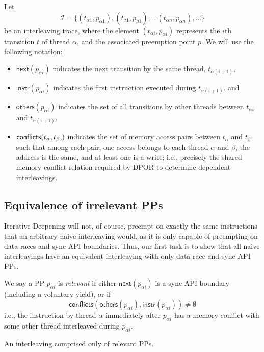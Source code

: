 \newcommand\ppnext[1]{\ensuremath{\mathsf{next}(#1)}}
\newcommand\ppinstr[1]{\ensuremath{\mathsf{instr}(#1)}}
\newcommand\ppothers[1]{\ensuremath{\mathsf{others}(#1)}}
\newcommand\pppfx[1]{\ensuremath{\mathsf{pfx}(#1)}}
\newcommand\conflicts[2]{\ensuremath{\mathsf{conflicts}(#1,#2)}}
\newcommand\pai{\ensuremath{p_{\alpha{}i}}}
\newcommand\tai{\ensuremath{t_{\alpha{}i}}}
Let
\[
	\mathcal{I} = \{(t_{\alpha{}1}, p_{\alpha{}1}), (t_{\beta{}1}, p_{\beta{}1}), ... (t_{\alpha{}n}, p_{\alpha{}n}), ...\}
\]
be an interleaving trace, where the element $(\tai, \pai)$ represents the $i$th transition $t$ of thread $\alpha$, and the associated preemption point $p$.
We will use the following notation:
\begin{itemize}
	\item $\ppnext{\pai}$ indicates the next transition by the same thread, $t_{\alpha{}(i+1)}$,
	\item $\ppinstr{\pai}$ indicates the first instruction executed during $t_{\alpha{}(i+1)}$. and
	\item $\ppothers{\pai}$ indicates the set of all transitions by other threads between $\tai$ and $t_{\alpha{}(i+1)}$.
	\item $\conflicts{t_\alpha,t_\beta}$ indicates the set of memory access pairs between $t_\alpha$ and $t_\beta$ such that among each pair, one access belongs to each thread $\alpha$ and $\beta$, the address is the same, and at least one is a write; i.e., precisely the shared memory conflict relation required by DPOR to determine dependent interleavings.
\end{itemize}


\subsection{Equivalence of irrelevant PPs}

Iterative Deepening will not, of course, preempt on exactly the same instructions that an arbitrary naive interleaving would,
as it is only capable of preempting on data races and sync API boundaries.
Thus, our first task is to show that all naive interleavings have an equivalent interleaving with only data-race and sync API PPs.

\begin{definition}
	We say a PP $\pai$ is {\em relevant} if either $\ppnext{\pai}$ is a sync API boundary (including a voluntary yield),
	or if
	\[
		\conflicts{\ppothers{\pai}}{\ppinstr{\pai}} \ne \emptyset
	\]
	i.e., the instruction by thread $\alpha$ immediately after $\pai$ has a memory conflict with some other thread interleaved during $\pai$.
\end{definition}
\begin{definition}
	An interleaving comprised only of relevant PPs.
\end{definition}

